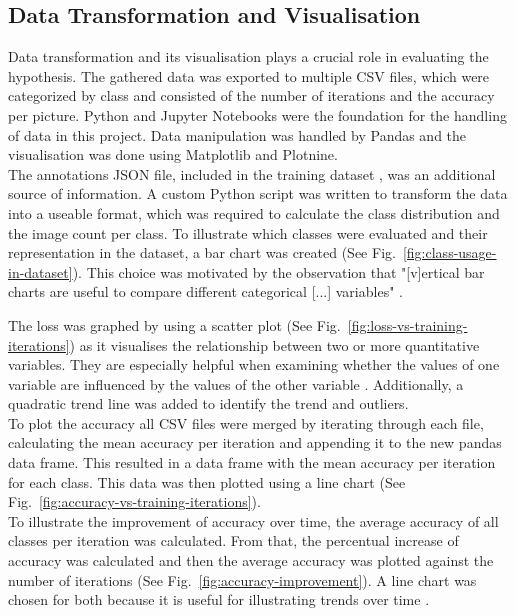 \subsection{Data Transformation and Visualisation}
Data transformation and its visualisation plays a crucial role in evaluating the hypothesis. The gathered data was exported to multiple CSV files, 
which were categorized by class and consisted of the number of iterations and the accuracy per picture. Python and Jupyter Notebooks were the
foundation for the handling of data in this project. Data manipulation was handled by Pandas and the visualisation was done using Matplotlib
and Plotnine.\\

The annotations JSON file, included in the training dataset \parencite{pascal2023}, was an additional source of information. 
A custom Python script was written to transform the data into a useable format, which was required to calculate the class distribution 
and the image count per class. To illustrate which classes were evaluated and their representation in the dataset, a bar chart was created 
(See Fig.~\ref{fig:class-usage-in-dataset}). This choice was motivated by the observation that "[v]ertical bar charts are useful to compare 
different categorical [...] variables" \parencite{Statistics-Canada2021}.\\
\newpage

The loss was graphed by using a scatter plot (See Fig.~\ref{fig:loss-vs-training-iterations})
as it visualises the relationship between two or more quantitative variables. They are especially helpful when examining whether
the values of one variable are influenced by the values of the other variable \parencite{Statistics-Canada2021b}. 
Additionally, a quadratic trend line was added to identify the trend and outliers.\\

To plot the accuracy all CSV files were merged by iterating through each file, calculating the mean accuracy per iteration and appending it
to the new pandas data frame. This resulted in a data frame with the mean accuracy per iteration for each class. This data was then plotted using
a line chart (See Fig.~\ref{fig:accuracy-vs-training-iterations}). \\

To illustrate the improvement of accuracy over time, the average accuracy of all classes per iteration was calculated.
From that, the percentual increase of accuracy was calculated and then the average accuracy was plotted against the number of iterations
(See Fig.~\ref{fig:accuracy-improvement}).
A line chart was chosen for both because it is useful for illustrating trends over time \parencite{Statistics-Canada2021a}.\\

